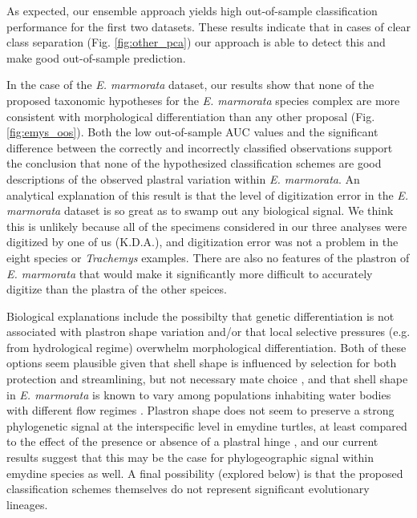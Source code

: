 \documentclass[12pt,letterpaper]{article}
\begin{document}
As expected, our ensemble approach yields high out-of-sample classification performance for the first two datasets. These results indicate that in cases of clear class separation (Fig. \ref{fig:other_pca}) our approach is able to detect this and make good out-of-sample prediction.

In the case of the \textit{E. marmorata} dataset, our results show that none of the proposed taxonomic hypotheses for the \textit{E. marmorata} species complex are more consistent with morphological differentiation than any other proposal (Fig. \ref{fig:emys_oos}). Both the low out-of-sample AUC values and the significant difference between the correctly and incorrectly classified observations support the conclusion that none of the hypothesized classification schemes are good descriptions of the observed plastral variation within \textit{E. marmorata}. An analytical explanation of this result is that the level of digitization error in the \textit{E. marmorata} dataset is so great as to swamp out any biological signal. We think this is unlikely because all of the specimens considered in our three analyses were digitized by one of us (K.D.A.), and digitization error was not a problem in the eight species or \textit{Trachemys} examples. There are also no features of the plastron of \textit{E. marmorata} that would make it significantly more difficult to accurately digitize than the plastra of the other speices.

Biological explanations include the possibilty that genetic differentiation is not associated with plastron shape variation and/or that local selective pressures (e.g. from hydrological regime) overwhelm morphological differentiation. Both of these options seem plausible given that shell shape is influenced by selection for both protection and streamlining, but not necessary mate choice \citep{Rivera2008,Rivera2011,Stayton2011,Rivera2014,Polly2016}, and that shell shape in \textit{E. marmorata} is known to vary among populations inhabiting water bodies with different flow regimes \citep{Holland1992,Lubcke2007,Germano2009}. Plastron shape does not seem to preserve a strong phylogenetic signal at the interspecific level in emydine turtles, at least compared to the effect of the presence or absence of a plastral hinge \citep{Angielczyk2011}, and our current results suggest that this may be the case for phylogeographic signal within emydine species as well. A final possibility (explored below) is that the proposed classification schemes themselves do not represent significant evolutionary lineages.
\end{document}
